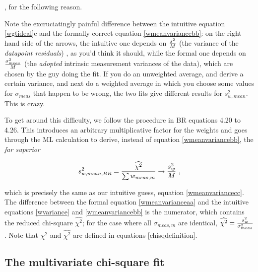 \documentclass[psfig,preprint]{aastex}
\begin{document}
, for the following reason.

        Note the excruciatingly painful difference between the intuitive
equation \ref{wgtideal}c and the formally correct equation
\ref{wmeanvariancebb}: on the right-hand side of the arrows, the
intuitive one depends on ${s^2 \over M}$ (the variance of the {\it
datapoint residuals}) , as you'd think it should, while the formal one
depends on $\sigma_{meas}^2 \over M$ (the {\it adopted}
intrinsic measurement variances of the data), which are chosen by the
guy doing the fit.  If you do an unweighted average, and derive a
certain variance, and next do a weighted average in which you choose
some values for $\sigma_{meas}$ that happen to be wrong, the two fits
give different results for $s_{w,mean}^2$.  This is crazy. 

        To get around this difficulty, we follow the procedure in BR
equations 4.20 to 4.26. This introduces an arbitrary multiplicative
factor for the weights and goes through the ML calculation to derive,
instead of equation \ref{wmeanvariancebb}, the {\it far superior}

\begin{equation} \label{wmeanvarianceaa}
s_{w,mean,BR}^2 = {\widehat{\chi^2} \over \sum w_{meas,m}} 
	\rightarrow {s_w^2 \over M} \ ,
\end{equation}

\noindent which is precisely the same as our intuitive guess, equation
\ref{wmeanvariancecc}.  The difference between the formal equation
\ref{wmeanvarianceaa} and the intuitive equations \ref{wvariance} and
\ref{wmeanvariancebb} is the numerator, which contains the reduced
chi-square $\widehat{\chi^2}$; for the case where all $\sigma_{meas,m}$
are identical, $\widehat{\chi^2} = {s_w^2 \over \sigma_{meas}^2}$.  Note
that $\chi^2$ and $\widehat{\chi^2}$ are defined in equations
\ref{chisqdefinition}. 

\subsection{The multivariate chi-square fit}
\label{sectionchisq}
\end{document}
